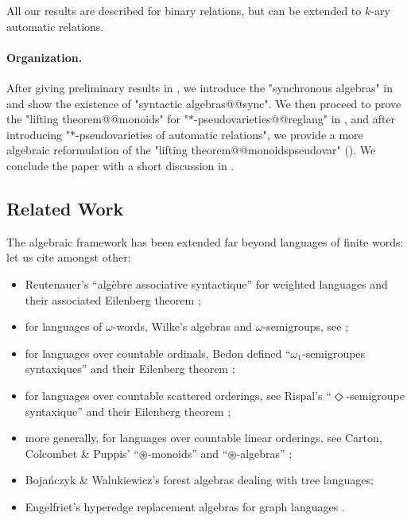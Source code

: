 \begin{remark}
	All our results are described for binary relations, but can be extended to
	$k$-ary automatic relations.
\end{remark}

\paragraph*{Organization.} After giving preliminary results in , we introduce
the "synchronous algebras" in  and show the existence of
"syntactic algebras@@sync". We then proceed to prove the "lifting theorem@@monoids" for 
"$*$-pseudovarieties@@reglang" in , and after introducing "$*$-pseudovarieties of automatic relations", we provide a more algebraic reformulation of the "lifting 
theorem@@monoidspseudovar" ().
We conclude the paper with
a short discussion in .

\subsection{Related Work}
\label{sec:algebra-related-work}

The algebraic framework has been extended far beyond languages of finite words: let us cite amongst other:
\begin{itemize}
	\item Reutenauer's ``algèbre associative syntactique'' for weighted languages
		\cite[Théorème I.2.1, p.~451]{Reutenauer1980SeriesFormelles} and their associated Eilenberg theorem \cite[Théorème III.1.1, p.~469]{Reutenauer1980SeriesFormelles};
	\item for languages of $\omega$-words, Wilke's algebras and $\omega$-semigroups,
		see \cite[\S II, pp.~75--131 \& \S VI, pp.~265--306]{Perrin2004InfiniteWords};
	\item for languages over countable ordinals, Bedon defined ``$\omega_1$-semi\-groupes syntaxiques'' \cite[\S3, pp.~49--109]{Bedon1998LangagesReconnaissables} and their Eilenberg theorem
		\cite[Theorem 22, p.~62]{Bedon1998Eilenberg};
	\item for languages over countable scattered orderings, see Rispal's ``$\Diamond$-semigroupe syntaxique'' \cite[\S 4.4, pp.~82--86]{Rispal2004Automates} and their Eilenberg theorem
		\cite[Theorem 6, p.~144]{Bedon2005Schutzenberger};
	\item more generally, for languages over countable linear orderings, see Carton, Colcombet \& Puppis' ``$\circledast$-monoids'' and ``$\circledast$-algebras''
		\cite[\S 3, p.~7]{Carton2018Algebraic};
	\item Bojańczyk \& Walukiewicz's 
		forest algebras \cite[\S 1.3, p.~4]{Bojanczyk2008Forest} \cite[\S 5, p.~159]{Bojanczyk2020MSO}
		dealing with tree languages;
	\item Engelfriet's hyperedge replacement algebras for graph languages
		\cite[\S 2.3, p.~100]{Courcelle2012Graph} \cite[\S 6.2, p.~194]{Bojanczyk2015Recognisable}.
\end{itemize}

